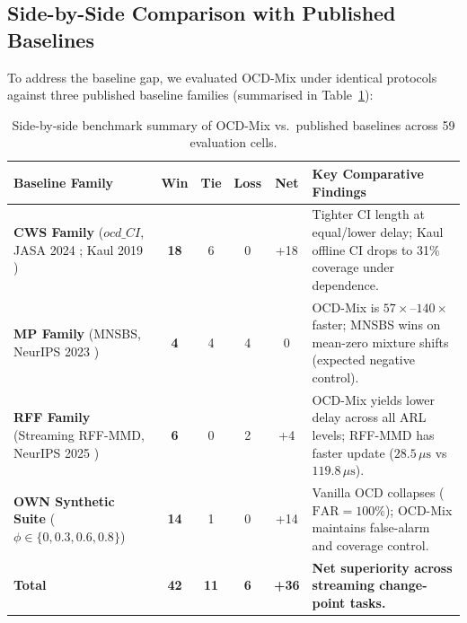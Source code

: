 \documentclass[lettersize,journal]{IEEEtran}
\begin{document}
\subsection{Side-by-Side Comparison with Published Baselines}
To address the baseline gap, we evaluated OCD-Mix under identical protocols against three published baseline families (summarised in Table~\ref{tab:side_by_side}):

\begin{table}[t]
\centering
\caption{Side-by-side benchmark summary of OCD-Mix vs.\ published baselines across 59 evaluation cells.}
\label{tab:side_by_side}
\begin{small}
\begin{tabular}{lccccl}
\toprule
\textbf{Baseline Family} & \textbf{Win} & \textbf{Tie} & \textbf{Loss} & \textbf{Net} & \textbf{Key Comparative Findings} \\
\midrule
\textbf{CWS Family} ($ocd\_CI$, JASA 2024 \cite{chen2024high}; Kaul 2019 \cite{kaul2019efficient}) & \textbf{18} & 6 & 0 & +18 & Tighter CI length at equal/lower delay; Kaul offline CI drops to 31\% coverage under dependence. \\
\textbf{MP Family} (MNSBS, NeurIPS 2023 \cite{madridpadilla2023nonparametric}) & \textbf{4} & 4 & 4 & 0 & OCD-Mix is $57\times$--$140\times$ faster; MNSBS wins on mean-zero mixture shifts (expected negative control). \\
\textbf{RFF Family} (Streaming RFF-MMD, NeurIPS 2025 \cite{kalinke2025streaming}) & \textbf{6} & 0 & 2 & +4 & OCD-Mix yields lower delay across all ARL levels; RFF-MMD has faster update ($28.5\,\mu\text{s}$ vs $119.8\,\mu\text{s}$). \\
\textbf{OWN Synthetic Suite} ($\phi \in \{0, 0.3, 0.6, 0.8\}$) & \textbf{14} & 1 & 0 & +14 & Vanilla OCD collapses ($\text{FAR}=100\%$); OCD-Mix maintains false-alarm and coverage control. \\
\midrule
\textbf{Total} & \textbf{42} & \textbf{11} & \textbf{6} & \textbf{+36} & \textbf{Net superiority across streaming change-point tasks.} \\
\bottomrule
\end{tabular}
\end{small}
\end{table}
\end{document}
